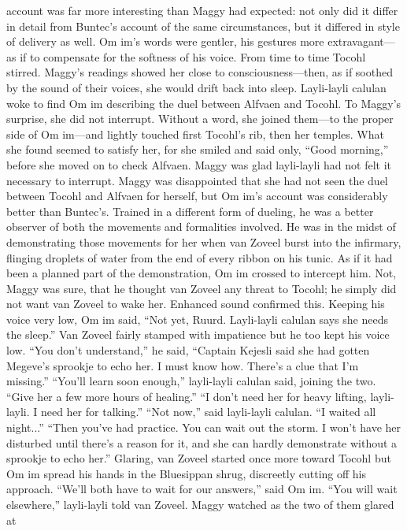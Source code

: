 \documentclass[9pt]{article}
\begin{document}
account was far more interesting than Maggy had expected: not only did it differ in detail from Buntec’s
account of the same circumstances, but it differed in style of delivery as well. Om im’s words were
gentler, his gestures more extravagant—as if to compensate for the softness of his voice.
From time to time Tocohl stirred. Maggy’s readings showed her close to consciousness—then, as if
soothed by the sound of their voices, she would drift back into sleep. Layli-layli calulan woke to find
Om im describing the duel between Alfvaen and Tocohl. To Maggy’s surprise, she did not interrupt.
Without a word, she joined them—to the proper side of Om im—and lightly touched first Tocohl’s rib,
then her temples. What she found seemed to satisfy her, for she smiled and said only, “Good morning,”
before she moved on to check Alfvaen.
Maggy was glad layli-layli had not felt it necessary to interrupt. Maggy was disappointed that she
had not seen the duel between Tocohl and Alfvaen for herself, but Om im’s account was considerably
better than Buntec’s. Trained in a different form of dueling, he was a better observer of both the
movements and formalities involved.
He was in the midst of demonstrating those movements for her when van Zoveel burst into the
infirmary, flinging droplets of water from the end of every ribbon on his tunic. As if it had been a planned
part of the demonstration, Om im crossed to intercept him.
Not, Maggy was sure, that he thought van Zoveel any threat to Tocohl; he simply did not want van
Zoveel to wake her. Enhanced sound confirmed this. Keeping his voice very low, Om im said, “Not yet,
Ruurd. Layli-layli calulan says she needs the sleep.”
Van Zoveel fairly stamped with impatience but he too kept his voice low. “You don’t understand,” he
said, “Captain Kejesli said she had gotten Megeve’s sprookje to echo her. I must know how. There’s a
clue that I’m missing.”
“You’ll learn soon enough,” layli-layli calulan said, joining the two. “Give her a few more hours of
healing.”
“I don’t need her for heavy lifting, layli-layli. I need her for talking.”
“Not now,” said layli-layli calulan.
“I waited all night...”
“Then you’ve had practice. You can wait out the storm. I won’t have her disturbed until there’s a
reason for it, and she can hardly demonstrate without a sprookje to echo her.”
Glaring, van Zoveel started once more toward Tocohl but Om im spread his hands in the Bluesippan
shrug, discreetly cutting off his approach. “We’ll both have to wait for our answers,” said Om im.
“You will wait elsewhere,” layli-layli told van Zoveel. Maggy watched as the two of them glared at
\end{document}
